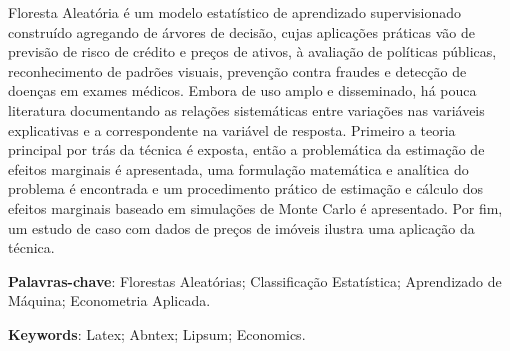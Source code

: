 %
%

\begin{resumo}

Floresta Aleatória é um modelo estatístico de aprendizado supervisionado construído agregando de árvores de decisão, cujas aplicações práticas vão de previsão de risco de crédito e preços de ativos, à avaliação de políticas públicas, reconhecimento de padrões visuais, prevenção contra fraudes e detecção de doenças em exames médicos. Embora de uso amplo e disseminado, há pouca literatura documentando as relações sistemáticas entre variações nas variáveis explicativas e a correspondente na variável de resposta. Primeiro a teoria principal por trás da técnica é exposta, então a problemática da estimação de efeitos marginais é apresentada, uma formulação matemática e analítica do problema é encontrada e um procedimento prático de estimação e cálculo dos efeitos marginais baseado em simulações de Monte Carlo é apresentado. Por fim, um estudo de caso com dados de preços de imóveis ilustra uma aplicação da técnica. 


\textbf{Palavras-chave}: Florestas Aleatórias; Classificação Estatística; Aprendizado de Máquina; Econometria Aplicada. %
\end{resumo}


\begin{resumo}[ABSTRACT] %
	


\textbf{Keywords}: Latex; Abntex; Lipsum; Economics. 	
\end{resumo}



